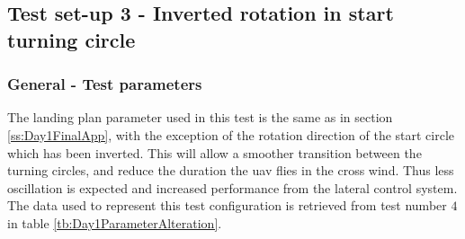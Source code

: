 \subsection{Test set-up 3 - Inverted rotation in start turning circle}\label{ss:Day1Inverted}
\subsubsection{General - Test parameters}
The landing plan parameter used in this test is the same as in section \ref{ss:Day1FinalApp}, with the exception of the rotation direction of the start circle which has been inverted. This will allow a smoother transition between the turning circles, and reduce the duration the \gls{uav} flies in the cross wind. Thus less oscillation is expected and increased performance from the lateral control system. The data used to represent this test configuration is retrieved from test number $4$ in table \ref{tb:Day1ParameterAlteration}.
